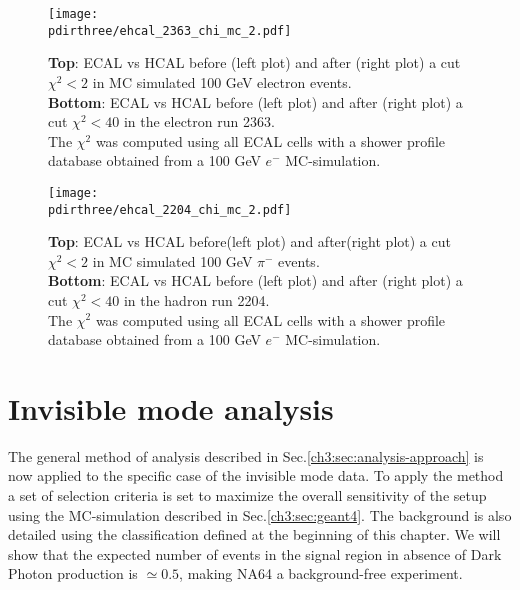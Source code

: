 \begin{figure}[h!]
  \begin{center}
    \texttt{[image: \\pdirthree/ehcal\_2363\_chi\_mc\_2.pdf]}
  \end{center}
  \caption{\textbf{Top}: ECAL vs HCAL before (left plot) and
    after (right plot) a cut
    $\chi^2<2$ in MC simulated 100 GeV electron events. \\
    \textbf{Bottom}: ECAL vs HCAL before (left plot) and after (right
    plot) a cut
    $\chi^2<40$ in the electron run 2363.\\
    The $\chi^2$ was computed using all ECAL cells with a shower
    profile database obtained from a 100 GeV $e^-$ MC-simulation. }
  \label{fig:ehcal_elec}
\end{figure}

\begin{figure}[h!]
  \begin{center}
    \texttt{[image: \\pdirthree/ehcal\_2204\_chi\_mc\_2.pdf]}
  \end{center}
  \caption{\textbf{Top}: ECAL vs HCAL before(left plot) and
    after(right plot) a cut
    $\chi^2<2$ in MC simulated 100 GeV $\pi^-$ events. \\
    \textbf{Bottom}: ECAL vs HCAL before (left plot) and after (right
    plot) a cut
    $\chi^2<40$ in the hadron run 2204.\\
    The $\chi^2$ was computed using all ECAL cells with a shower
    profile database obtained from a 100 GeV $e^-$ MC-simulation. }
  \label{fig:ehcal_hadr}
\end{figure}
\fi

\section{Invisible mode analysis}
\label{ch3:sec:analysis-invis}

The general method of analysis described in Sec.\ref{ch3:sec:analysis-approach} is now applied to the specific case of the invisible mode data. To apply the method a set of selection criteria is set to maximize the overall sensitivity of the setup using the MC-simulation described in Sec.\ref{ch3:sec:geant4}. The background is also detailed using the classification defined at the beginning of this chapter. We will show that the expected number of events in the signal region in absence of Dark Photon production is $\simeq 0.5$, making NA64 a background-free experiment.


